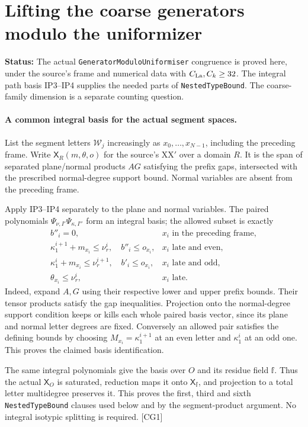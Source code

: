 \documentclass[11pt,a4paper]{article}
\numberwithin{equation}{section}
\theoremstyle{remark}\newtheorem{remark}[theorem]{Remark}
\newcommand{\status}[1]{\textbf{Status:} #1}
\begin{document}
\section{Lifting the coarse generators modulo the uniformizer}
\label{sec:coarse-lift}

\status{The actual \texttt{GeneratorModuloUniformiser} congruence is proved here, under the source's frame and numerical data with $C_{\rm La},C_k\ge32$. The integral path basis IP3--IP4 supplies the needed parts of \texttt{NestedTypeBound}. The coarse-family dimension is a separate counting question.}

\paragraph{A common integral basis for the actual segment spaces.}
List the segment letters $\mathcal W_j$ increasingly as $x_0,\ldots,x_{N-1}$, including
the preceding frame. Write $\mathsf X_R(m,\theta,o)$ for the source's
$\mathrm{XX}'$ over a domain $R$. It is the span of separated plane/normal
products $AG$ satisfying the prefix gaps, intersected with the prescribed
normal-degree support bound. Normal variables are absent from the
preceding frame.

Apply IP3--IP4 separately to the plane and normal variables. The paired
polynomials $\Psi_{\nu,I'}\Psi_{\kappa,I''}$ form an integral basis;
the allowed subset is exactly
\[
\begin{array}{ll}
 b''_i=0,&x_i\text{ in the preceding frame},\\
 \kappa^{i+1}_1+m_{x_i}\le\nu^i_r,\quad b''_i\le o_{x_i},
       &x_i\text{ late and even},\\
 \kappa^i_1+m_{x_i}\le\nu^{i+1}_r,\quad b'_i\le o_{x_i},
       &x_i\text{ late and odd},\\
 \theta_{x_i}\le\nu^i_r,&x_i\text{ late}.
\end{array}                                                    \tag{CG.1}
\]
Indeed, expand $A,G$ using their respective lower and upper prefix
bounds. Their tensor products satisfy the gap inequalities. Projection
onto the normal-degree support condition keeps or kills each whole
paired basis vector, since its plane and normal letter degrees are fixed.
Conversely an allowed pair satisfies the defining bounds by choosing
$M_{x_i}=\kappa^{i+1}_1$ at an even letter and $\kappa^i_1$ at an odd one.
This proves the claimed basis identification.

The same integral polynomials give the basis over $O$ and its residue
field $\mathbb f$. Thus the actual $\mathsf X_O$ is saturated, reduction
maps it onto $\mathsf X_{\mathbb f}$, and projection to a total letter
multidegree preserves it. This proves the first, third and sixth
\texttt{NestedTypeBound} clauses used below and by the segment-product
argument. No integral isotypic splitting is required. \textsf{[CG1]}
\end{document}
